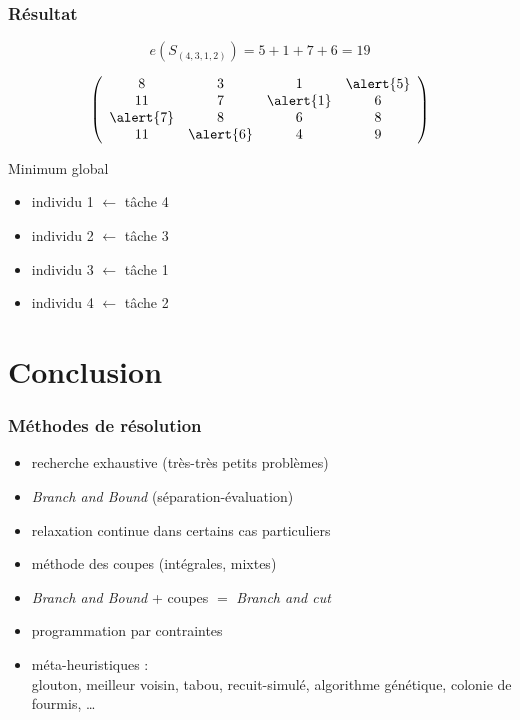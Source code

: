 \documentclass{beamer}
\begin{document}
\begin{frame}
  \frametitle{Résultat}


  \[
  e(S_{(4,3,1,2)}) = 5 + 1 + 7 + 6 = 19
  \]
  
  \[
  \left(
  \begin{array}{cccc}
    8 & 3 & 1 & \alert{5} \\
    11 & 7 & \alert{1} & 6 \\
    \alert{7} & 8 & 6 & 8 \\
    11 & \alert{6} & 4 & 9 
  \end{array}
  \right)
  \]

  \begin{block}{Minimum global}
  \begin{itemize}
    \item individu 1 $\leftarrow$ tâche 4
    \item individu 2 $\leftarrow$ tâche 3
    \item individu 3 $\leftarrow$ tâche 1
    \item individu 4 $\leftarrow$ tâche 2
  \end{itemize}
  \end{block}
\end{frame}


\section{Conclusion}

\begin{frame}
  \frametitle{Méthodes de résolution}

  \begin{itemize}
  \item recherche exhaustive (très-très petits problèmes)
  \item \alert{\emph{Branch and Bound}} (séparation-évaluation)
  \item relaxation continue dans certains cas particuliers
  \item méthode des coupes (intégrales, mixtes)
  \item \emph{Branch and Bound} + coupes $=$ \emph{Branch and cut}
  \item programmation par contraintes
  \item méta-heuristiques : \\
      glouton, meilleur voisin, tabou, recuit-simulé, algorithme génétique, colonie de fourmis, \dots
  \end{itemize}
  
\end{frame}
\end{document}
